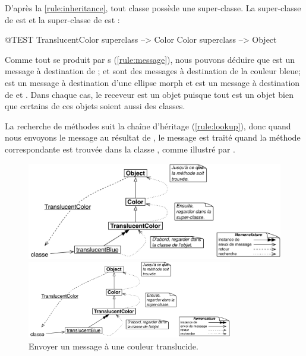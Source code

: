 \documentclass[a4paper,10pt,twoside]{book}
\begin{document}
D'apr\`es la \ref{rule:inheritance},
tout classe possède une super-classe.
La super-classe de  est  et la super-classe de  est :
\begin{code}{@TEST}
TranslucentColor superclass --> Color
Color superclass                   --> Object
\end{code}

Comme tout se produit par s (\ref{rule:message}), nous pouvons déduire que  est un message à destination de ;  et  sont des messages à destination de la couleur bleue;  est un message à destination d'une ellipse morph et  est un message à destination de  et .
Dans chaque cas, le receveur est un objet puisque tout est un objet bien que certains de ces objets soient aussi des classes.

La recherche de méthodes suit la chaîne d'héritage (\ref{rule:lookup}), donc quand nous envoyons le message  au résultat de 
, le message est traité quand la méthode correspondante est trouvée dans la classe , comme illustré par .

\begin{center}
\begin{figure}[!ht]
\ifluluelse
	{\centerline{\includegraphics[width=\textwidth]{TranslucentClassMessage}}}
	{\centerline{\includegraphics[width=0.8\textwidth]{TranslucentClassMessage}}}
\caption{Envoyer un message à une couleur translucide.\label{fig:classmessage}}
\end{figure}
\end{center}
\end{document}
